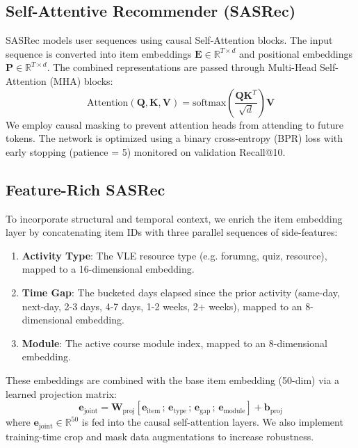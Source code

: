 \documentclass[10pt,journal,compsoc]{IEEEtran}
\begin{document}
\subsection{Self-Attentive Recommender (SASRec)}
SASRec models user sequences using causal Self-Attention blocks. The input sequence is converted into item embeddings $\mathbf{E} \in \mathbb{R}^{T \times d}$ and positional embeddings $\mathbf{P} \in \mathbb{R}^{T \times d}$. The combined representations are passed through Multi-Head Self-Attention (MHA) blocks:
$$\text{Attention}(\mathbf{Q}, \mathbf{K}, \mathbf{V}) = \text{softmax}\left(\frac{\mathbf{Q} \mathbf{K}^T}{\sqrt{d}}\right) \mathbf{V}$$
We employ causal masking to prevent attention heads from attending to future tokens. The network is optimized using a binary cross-entropy (BPR) loss with early stopping (patience = 5) monitored on validation Recall@10.

\subsection{Feature-Rich SASRec}
To incorporate structural and temporal context, we enrich the item embedding layer by concatenating item IDs with three parallel sequences of side-features:
\begin{enumerate}
    \item \textbf{Activity Type}: The VLE resource type (e.g. forumng, quiz, resource), mapped to a 16-dimensional embedding.
    \item \textbf{Time Gap}: The bucketed days elapsed since the prior activity (same-day, next-day, 2-3 days, 4-7 days, 1-2 weeks, 2+ weeks), mapped to an 8-dimensional embedding.
    \item \textbf{Module}: The active course module index, mapped to an 8-dimensional embedding.
\end{enumerate}
These embeddings are combined with the base item embedding (50-dim) via a learned projection matrix:
$$\mathbf{e}_{\text{joint}} = \mathbf{W}_{\text{proj}} \left[ \mathbf{e}_{\text{item}} \,;\, \mathbf{e}_{\text{type}} \,;\, \mathbf{e}_{\text{gap}} \,;\, \mathbf{e}_{\text{module}} \right] + \mathbf{b}_{\text{proj}}$$
where $\mathbf{e}_{\text{joint}} \in \mathbb{R}^{50}$ is fed into the causal self-attention layers. We also implement training-time crop and mask data augmentations to increase robustness.
\end{document}
